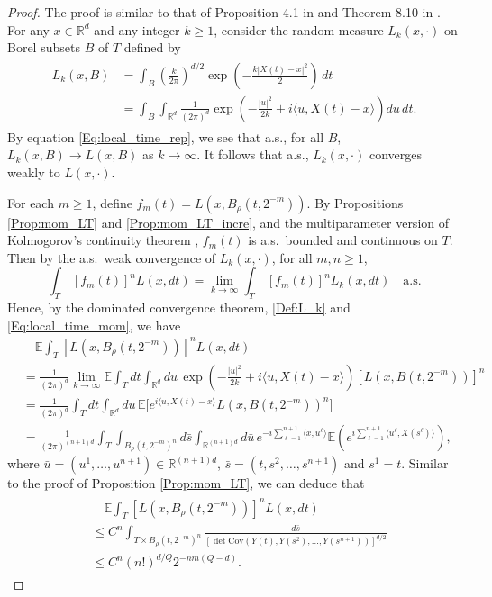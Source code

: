 \documentclass[11pt, reqno]{amsart}
\def\R{{\mathbb R}}
\def\E{{\mathbb E}}
\numberwithin{equation}{section}
\begin{document}
\begin{proof}
The proof is similar to that of Proposition 4.1 in \cite{X97} and Theorem 8.10 in \cite{X09}.
For any $x \in \R^d$ and any integer $k \ge 1$, consider the random measure $L_k(x, \cdot)$ on Borel subsets 
$B$ of $T$ defined by
\begin{align}
\begin{aligned}\label{Def:L_k}
L_k(x, B) &= \int_B \left(\frac{k}{2\pi}\right)^{d/2} \exp\left({-\frac{k|X(t) - x|^2}{2}}\right) \, dt\\
& = \int_B \int_{\R^d} \frac{1}{(2\pi)^d} \exp\left( -\frac{|u|^2}{2k} + i\langle u, X(t) - x\rangle \right) du\, dt.
\end{aligned}
\end{align}
By equation \eqref{Eq:local_time_rep}, we see that a.s., for all $B$, $L_k(x, B) \to L(x, B)$ as $k \to \infty$.
It follows that a.s., $L_k(x, \cdot)$ converges weakly to $L(x, \cdot)$.

For each $m \ge 1$, define $f_m(t) = L(x, B_\rho(t, 2^{-m}))$.
By Propositions \ref{Prop:mom_LT} and \ref{Prop:mom_LT_incre}, and the multiparameter version of Kolmogorov's 
continuity theorem \cite{K}, $f_m(t)$ is a.s.~bounded and continuous on $T$.
Then by the a.s.~weak convergence of $L_k(x, \cdot)$, for all $m, n \ge 1$,
\[ \int_T\, [f_m(t)]^n L(x, dt) = \lim_{k \to \infty} \int_T \, [f_m(t)]^n L_{k}(x, dt) \quad \text{a.s.} \]
Hence, by the dominated convergence theorem, \eqref{Def:L_k} and \eqref{Eq:local_time_mom}, we have
\begin{align*}
&\quad \E \int_T [L(x, B_\rho(t, 2^{-m}))]^n L(x, dt)\\
& =\frac{1}{(2\pi)^d} \lim_{k \to \infty} \E \int_T dt \int_{\R^d} du \, \exp\left( -\frac{|u|^2}{2k} + i \langle u, 
X(t) - x\rangle \right) \left[L(x, B(t, 2^{-m})) \right]^n\\
& = \frac{1}{(2\pi)^d}\int_T dt \int_{\R^d} du \, \E \big[e^{i \langle u, X(t) - x\rangle} L(x, B(t, 2^{-m}))^n \big]\\
& = \frac{1}{(2\pi)^{(n+1)d}} \int_T \int_{{B_\rho(t, 2^{-m})}^n}d\bar{s} \int_{\R^{(n+1)d}} d\bar{u}\, e^{-i\sum_{\ell=1}^{n+1} 
\langle x, u^\ell \rangle} \E \left(e^{i\sum_{\ell=1}^{n+1} \langle u^\ell, X(s^\ell)\rangle}\right),
\end{align*}
where $\bar{u} = (u^1, \dots, u^{n+1}) \in \R^{(n+1)d}$, $\bar{s} = (t, s^2,\dots, s^{n+1})$ and $s^1 = t$.
Similar to the proof of Proposition \ref{Prop:mom_LT}, we can deduce that
\begin{align}\begin{aligned}\label{Eq:E_integral_f}
&\quad \E\int_T [L(x, B_\rho(t, 2^{-m}))]^n L(x, dt)\\
& \le C^n \int_{T \times {B_\rho(t, 2^{-m})}^n} \frac{d\bar{s}}{[\det \mathrm{Cov}(Y(t), Y(s^2), \dots, 
Y(s^{n+1}))]^{d/2}}\\
& \le C^n (n!)^{d/Q} 2^{-nm (Q-d)}.
\end{aligned}\end{align}


\end{proof}
\end{document}
